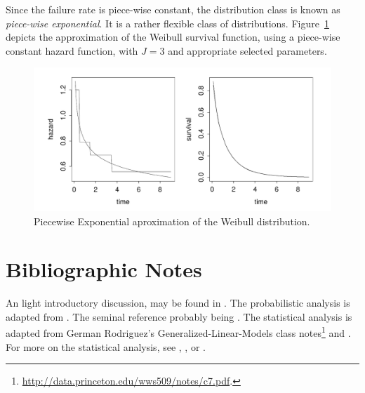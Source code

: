 Since the failure rate is piece-wise constant, the distribution class is known as \emph{piece-wise exponential}.
It is a rather flexible class of distributions. Figure~\ref{fig:piecewise_exponential} depicts the approximation of the Weibull survival function, using a piece-wise constant hazard function, with $J=3$ and appropriate selected parameters.
\begin{figure}[ht]
\centering
\includegraphics[height=0.2\textheight]{art/piecewise_exponential}
\caption{Piecewise Exponential aproximation of the Weibull distribution.}
\label{fig:piecewise_exponential}
\end{figure}





\section{Bibliographic Notes}
An light introductory discussion, may be found in \cite{nahmias_production_2015}. 
The probabilistic analysis is adapted from \cite{aven_stochastic_1999}.
The seminal reference probably being \cite{barlow_mathematical_1965}.
The statistical analysis is adapted from German Rodriguez's Generalized-Linear-Models class notes\footnote{\url{http://data.princeton.edu/wws509/notes/c7.pdf}.} and \cite[Ch.8]{natrella_nist/sematech_2010}.
For more on the statistical analysis, see \cite{cox_analysis_1984}, \cite{kalbfleisch_statistical_2002}, or \cite{klein_survival_2005}.


% 